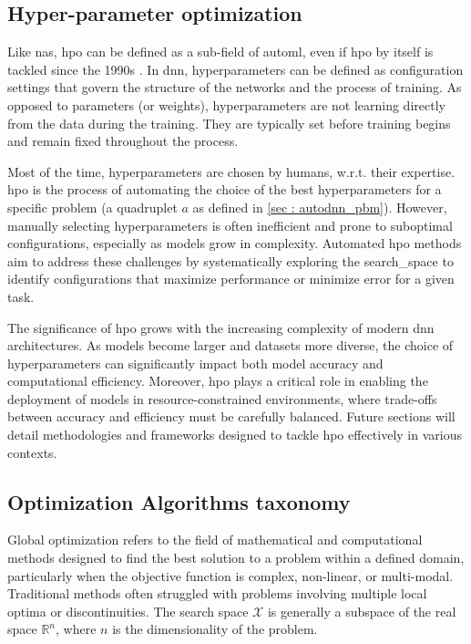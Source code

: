 \subsection{Hyper-parameter optimization}
\label{sec : hpo}
Like \acrshort{nas}, \acrshort{hpo} can be defined as a sub-field of \acrshort{automl}, even if \acrshort{hpo} by itself is tackled since the 1990s \cite{feurer_hyperparameter_2019}. In \acrfull{dnn}, \glspl{hyperparameter} can be defined as configuration settings that govern the structure of the networks and the process of training. As opposed to parameters (or weights), \glspl{hyperparameter} are not learning directly from the data during the training. They are typically set before training begins and remain fixed throughout the process.

Most of the time, \glspl{hyperparameter} are chosen by humans, w.r.t. their expertise. \acrshort{hpo} is the process of automating the choice of the best \glspl{hyperparameter} for a specific problem (a quadruplet $a$ as defined in \ref{sec : autodnn_pbm}). However, manually selecting \glspl{hyperparameter} is often inefficient and prone to suboptimal configurations, especially as models grow in complexity. Automated \acrshort{hpo} methods aim to address these challenges by systematically exploring the \gls{search_space} to identify configurations that maximize performance or minimize error for a given task.

The significance of \acrshort{hpo} grows with the increasing complexity of modern \acrshort{dnn} architectures. As models become larger and datasets more diverse, the choice of \glspl{hyperparameter} can significantly impact both model accuracy and computational efficiency. Moreover, \acrshort{hpo} plays a critical role in enabling the deployment of models in resource-constrained environments, where trade-offs between accuracy and efficiency must be carefully balanced. Future sections will detail methodologies and frameworks designed to tackle \acrshort{hpo} effectively in various contexts.



\subsection{Optimization Algorithms taxonomy}
\label{sec : opt_algo}


Global optimization refers to the field of mathematical and computational methods designed to find the best solution to a problem within a defined domain, particularly when the objective function is complex, non-linear, or multi-modal. Traditional methods often struggled with problems involving multiple local optima or discontinuities. The search space $\mathcal X$ is generally a subspace of the real space $\mathbb{R}^n$, where $n$ is the dimensionality of the problem.


